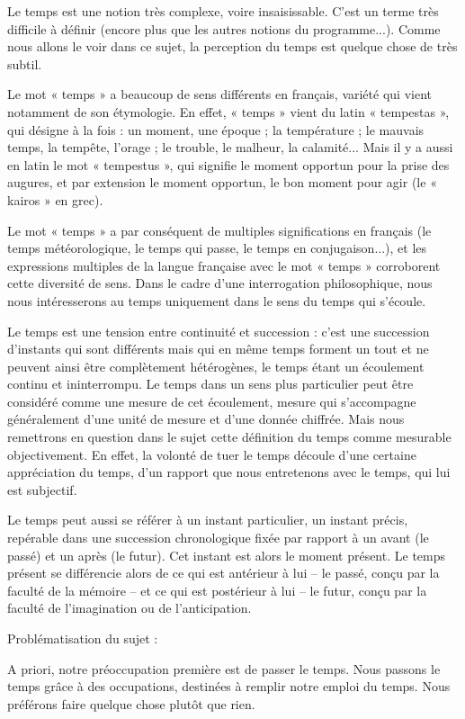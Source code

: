 \documentclass[french]{book}
\theoremstyle{definition}
\begin{document}
Le temps est une notion très complexe, voire insaisissable. C’est un terme très difficile à définir (encore plus que les autres notions du programme...). Comme nous allons le voir dans ce sujet, la perception du temps est quelque chose de très subtil.

Le mot « temps » a beaucoup de sens différents en français, variété qui vient notamment de son étymologie. En effet, « temps » vient du latin « tempestas », qui désigne à la fois : un moment, une époque ; la température ; le mauvais temps, la tempête, l’orage ; le trouble, le malheur, la calamité... Mais il y a aussi en latin le mot « tempestus », qui signifie le moment opportun pour la prise des augures, et par extension le moment opportun, le bon moment pour agir (le « kairos » en grec).

Le mot « temps » a par conséquent de multiples significations en français (le temps météorologique, le temps qui passe, le temps en conjugaison...), et les expressions multiples de la langue française avec le mot « temps » corroborent cette diversité de sens. Dans le cadre d’une interrogation philosophique, nous nous intéresserons au temps uniquement dans le sens du temps qui s’écoule.

Le temps est une tension entre continuité et succession : c’est une succession d’instants qui sont différents mais qui en même temps forment un tout et ne peuvent ainsi être complètement hétérogènes, le temps étant un écoulement continu et ininterrompu. Le temps dans un sens plus particulier peut être considéré comme une mesure de cet écoulement, mesure qui s’accompagne généralement d’une unité de mesure et d’une donnée chiffrée. Mais nous remettrons en question dans le sujet cette définition du temps comme mesurable objectivement. En effet, la volonté de tuer le temps découle d’une certaine appréciation du temps, d’un rapport que nous entretenons avec le temps, qui lui est subjectif.

Le temps peut aussi se référer à un instant particulier, un instant précis, repérable dans une succession chronologique fixée par rapport à un avant (le passé) et un après (le futur). Cet instant est alors le moment présent. Le temps présent se différencie alors de ce qui est antérieur à lui – le passé, conçu par la faculté de la mémoire – et ce qui est postérieur à lui – le futur, conçu par la faculté de l’imagination ou de l’anticipation.

Problématisation du sujet :

A priori, notre préoccupation première est de passer le temps. Nous passons le temps grâce à des occupations, destinées à remplir notre emploi du temps. Nous préférons faire quelque chose plutôt que rien.
\end{document}
